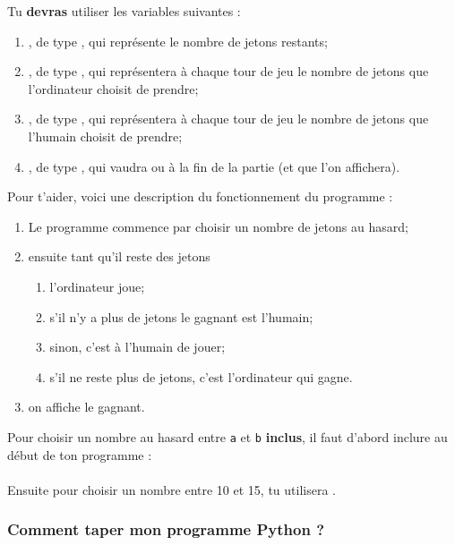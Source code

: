 \documentclass[a4paper,12pt]{book}
\begin{document}
Tu \textbf{devras} utiliser les variables suivantes :
\begin{enumerate}[--]
    \item   {}, de type , qui représente le nombre de jetons restants;
	\item 	{}, de type , qui représentera à chaque tour de jeu le nombre
            de jetons que l'ordinateur choisit de prendre;
	\item 	 {}, de type , qui représentera à chaque tour de jeu le nombre
                de jetons que l'humain choisit de prendre;
    \item   {}, de type , qui vaudra  ou  
            à la fin de la partie (et que l'on affichera).
\end{enumerate}
Pour t'aider, voici une description du fonctionnement du programme :
\begin{enumerate}[--]
	\item 	Le programme commence par choisir un nombre de jetons au hasard;
	\item 	ensuite tant qu'il reste des jetons
    \begin{enumerate}[\textbullet]
    	\item 	l'ordinateur joue;
    	\item 	s'il n'y a plus de jetons le gagnant est l'humain;
        \item   sinon, c'est à l'humain de jouer;
        \item  s'il ne reste plus de jetons, c'est l'ordinateur qui gagne.
    \end{enumerate}
    \item on affiche le gagnant.
\end{enumerate}
Pour choisir un nombre au hasard entre \texttt{a} et \texttt{b} \textbf{inclus}, il faut d'abord inclure au début de ton programme :\\
\\

Ensuite pour choisir un nombre entre 10 et 15, tu utilisera .\\

\subsubsection*{Comment taper mon programme Python ?}
\end{document}
